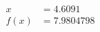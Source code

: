 \documentclass[preview]{standalone}
\begin{document}
\begin{align*}
x &= 4.6091\\f(x) &= 7.9804798
\end{align*}
\end{document}
